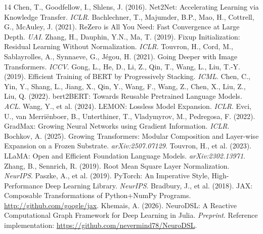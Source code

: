 \documentclass[11pt,a4paper]{article}
\begin{document}
\begin{thebibliography}{14}
 Chen, T., Goodfellow, I., Shlens, J. (2016). Net2Net: Accelerating Learning via Knowledge Transfer. \emph{ICLR}.
 Bachlechner, T., Majumder, B.P., Mao, H., Cottrell, G., McAuley, J. (2021). ReZero is All You Need: Fast Convergence at Large Depth. \emph{UAI}.
 Zhang, H., Dauphin, Y.N., Ma, T. (2019). Fixup Initialization: Residual Learning Without Normalization. \emph{ICLR}.
 Touvron, H., Cord, M., Sablayrolles, A., Synnaeve, G., J\'egou, H. (2021). Going Deeper with Image Transformers. \emph{ICCV}.
 Gong, L., He, D., Li, Z., Qin, T., Wang, L., Liu, T.-Y. (2019). Efficient Training of BERT by Progressively Stacking. \emph{ICML}.
 Chen, C., Yin, Y., Shang, L., Jiang, X., Qin, Y., Wang, F., Wang, Z., Chen, X., Liu, Z., Liu, Q. (2022). bert2BERT: Towards Reusable Pretrained Language Models. \emph{ACL}.
 Wang, Y., et al. (2024). LEMON: Lossless Model Expansion. \emph{ICLR}.
 Evci, U., van Merri\"enboer, B., Unterthiner, T., Vladymyrov, M., Pedregosa, F. (2022). GradMax: Growing Neural Networks using Gradient Information. \emph{ICLR}.
 Bochkov, A. (2025). Growing Transformers: Modular Composition and Layer-wise Expansion on a Frozen Substrate. \emph{arXiv:2507.07129}.
 Touvron, H., et al. (2023). LLaMA: Open and Efficient Foundation Language Models. \emph{arXiv:2302.13971}.
 Zhang, B., Sennrich, R. (2019). Root Mean Square Layer Normalization. \emph{NeurIPS}.
 Paszke, A., et al. (2019). PyTorch: An Imperative Style, High-Performance Deep Learning Library. \emph{NeurIPS}.
 Bradbury, J., et al. (2018). JAX: Composable Transformations of Python+NumPy Programs. \url{http://github.com/google/jax}.
 Khemais, A. (2026). NeuroDSL: A Reactive Computational Graph Framework for Deep Learning in Julia. \emph{Preprint}. Reference implementation: \url{https://github.com/nevermind78/NeuroDSL}.
\end{thebibliography}
\end{document}
